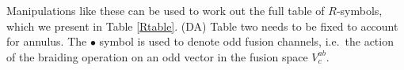 \documentclass[12pt,a4paper]{article}
\newcommand{\unit}{\mathds{1}}
\newcommand{\dave}[1]{{\color{ao(english)}\footnotesize{(DA) #1}}}
\begin{document}
Manipulations like these can be used to work out the full table of $R$-symbols, which we present in Table \ref{Rtable}. 
\dave{Table two needs to be fixed to account for annulus.}
The $\bullet$ symbol is used to denote odd fusion channels, i.e.\ the action of 
the braiding operation on an odd vector in the fusion space $V^{ab}_c$.  

\end{document}
